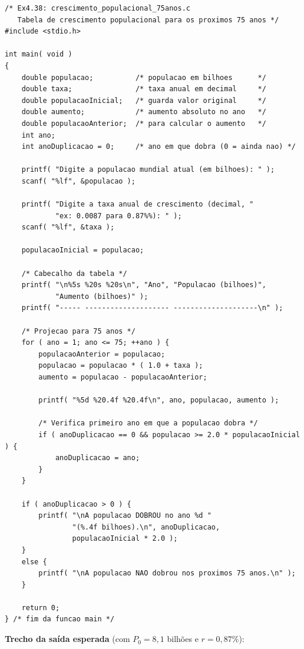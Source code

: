 \documentclass[12pt,a4paper]{article}
\begin{document}
\begin{respostabox}
\begin{lstlisting}
/* Ex4.38: crescimento_populacional_75anos.c
   Tabela de crescimento populacional para os proximos 75 anos */
#include <stdio.h>

int main( void )
{
    double populacao;          /* populacao em bilhoes      */
    double taxa;               /* taxa anual em decimal     */
    double populacaoInicial;   /* guarda valor original     */
    double aumento;            /* aumento absoluto no ano   */
    double populacaoAnterior;  /* para calcular o aumento   */
    int ano;
    int anoDuplicacao = 0;     /* ano em que dobra (0 = ainda nao) */

    printf( "Digite a populacao mundial atual (em bilhoes): " );
    scanf( "%lf", &populacao );

    printf( "Digite a taxa anual de crescimento (decimal, "
            "ex: 0.0087 para 0.87%%): " );
    scanf( "%lf", &taxa );

    populacaoInicial = populacao;

    /* Cabecalho da tabela */
    printf( "\n%5s %20s %20s\n", "Ano", "Populacao (bilhoes)",
            "Aumento (bilhoes)" );
    printf( "----- -------------------- --------------------\n" );

    /* Projecao para 75 anos */
    for ( ano = 1; ano <= 75; ++ano ) {
        populacaoAnterior = populacao;
        populacao = populacao * ( 1.0 + taxa );
        aumento = populacao - populacaoAnterior;

        printf( "%5d %20.4f %20.4f\n", ano, populacao, aumento );

        /* Verifica primeiro ano em que a populacao dobra */
        if ( anoDuplicacao == 0 && populacao >= 2.0 * populacaoInicial ) {
            anoDuplicacao = ano;
        }
    }

    if ( anoDuplicacao > 0 ) {
        printf( "\nA populacao DOBROU no ano %d "
                "(%.4f bilhoes).\n", anoDuplicacao,
                populacaoInicial * 2.0 );
    }
    else {
        printf( "\nA populacao NAO dobrou nos proximos 75 anos.\n" );
    }

    return 0;
} /* fim da funcao main */
\end{lstlisting}

\textbf{Trecho da saída esperada} (com $P_0 = 8{,}1$ bilhões e $r = 0{,}87\%$):


\end{respostabox}
\end{document}
